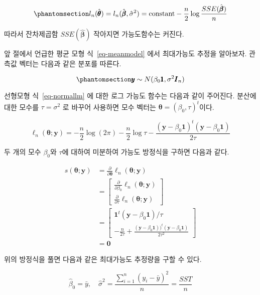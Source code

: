 \documentclass[
  11pt,
  a4paper,
  oneside]{scrbook}
\newcommand{\pardifftwo}[2]{\frac{\partial #1}{\partial #2 }}
\theoremstyle{definition}
\theoremstyle{plain}
\theoremstyle{definition}
\theoremstyle{definition}
\theoremstyle{remark}
\begin{document}
\begin{equation}\phantomsection\label{eq-linregloglike}{
l_n(\hat { \pmb \theta} ) = l_n(\hat { \pmb \beta} ,\hat \sigma^2 ) 
= \text{constant}  - \frac{n}{2} \log \frac{SSE(\hat { \pmb \beta})}{n}
}\end{equation}

따라서 잔차제곱함 \(SSE(\hat { \pmb \beta})\) 작아지면 가능도함수는
커진다.

앞 절에서 언급한 평균 모형 식~\ref{eq-meanmodel} 에서 최대가능도 추정을
알아보자. 관측값 벡터는 다음과 같은 분포를 따른다.

\begin{equation}\phantomsection\label{eq-meanlm}{
\pmb y \sim N( \beta_0 \pmb 1 , \sigma^2 \pmb I_n) 
}\end{equation}

선형모형 식~\ref{eq-normallm} 에 대한 로그 가능도 함수는 다음과 같이
주어진다. 분산에 대한 모수를 \(\tau=\sigma^2\) 로 바꾸어 사용하면 모수
벡터는 \(\pmb \theta = (\beta_0, \tau)^t\)이다.

\[ 
\ell_n( \pmb \theta; \pmb y) = -\frac{n}{2} \log (2 \pi)-\frac{n}{2} \log \tau -\frac { ( \pmb y- \beta_0 \pmb 1  )^t ( \pmb y-  \beta_0 \pmb 1) }{2\tau}  
\]

두 개의 모수 \(\beta_0\)와 \(\tau\)에 대하여 미분하여 가능도 방정식을
구하면 다음과 같다.

\[
\begin{align}
s( \pmb \theta;  \pmb y) & =  \pardifftwo{}{ \pmb \theta}\ell_n( \pmb \theta;  \pmb y ) \\
  & =  \begin{bmatrix}
    \pardifftwo{}{ \beta_0}\ell_n( \pmb \theta;  \pmb y ) \\
    \pardifftwo{}{\tau}\ell_n( \pmb \theta;  \pmb y ) 
  \end{bmatrix} \\
  & = 
  \begin{bmatrix}
     \pmb 1^t ( \pmb y-  \beta_0 \pmb 1)/\tau \\
    -\frac{n}{2\tau} +\frac { ( \pmb y- \beta_0 \pmb 1))^t ( \pmb y- \beta_0 \pmb 1) }{2\tau^2} 
  \end{bmatrix} \\
  & = \pmb 0
\end{align}
\]

위의 방정식을 풀면 다음과 같은 최대가능도 추정량을 구할 수 있다.

\[
\hat \beta_0 = \bar y, \quad {\hat \sigma}^2 = \frac{\sum_{i=1}^n (y_i - \bar y)^2}{n} = \frac{SST}{n} 
\]
\end{document}
